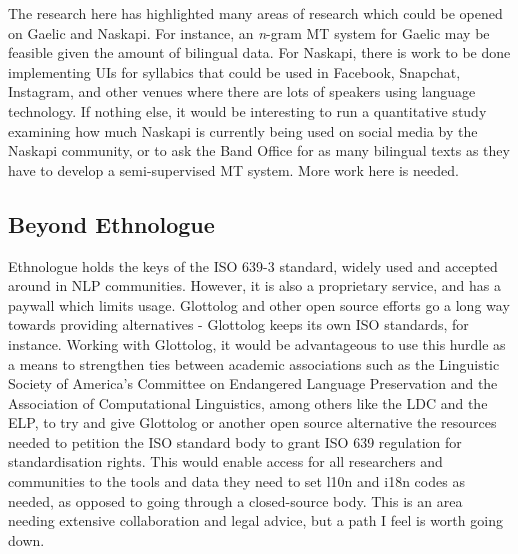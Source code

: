 The research here has highlighted many areas of research which could be opened on Gaelic and Naskapi. For instance, an \textit{n}-gram MT system for Gaelic may be feasible given the amount of bilingual data. For Naskapi, there is work to be done implementing UIs for syllabics that could be used in Facebook, Snapchat, Instagram, and other venues where there are lots of speakers using language technology. If nothing else, it would be interesting to run a quantitative study examining how much Naskapi is currently being used on social media by the Naskapi community, or to ask the Band Office for as many bilingual texts as they have to develop a semi-supervised MT system. More work here is needed.

\subsection{Beyond Ethnologue}

Ethnologue holds the keys of the ISO 639-3 standard, widely used and accepted around in NLP communities. However, it is also a proprietary service, and has a paywall which limits usage. Glottolog and other open source efforts go a long way towards providing alternatives - Glottolog keeps its own ISO standards, for instance. Working with Glottolog, it would be advantageous to use this hurdle as a means to strengthen ties between academic associations such as the Linguistic Society of America's Committee on Endangered Language Preservation and the Association of Computational Linguistics, among others like the LDC and the ELP, to try and give Glottolog or another open source alternative the resources needed to petition the ISO standard body to grant ISO 639 regulation for standardisation rights. This would enable access for all researchers and communities to the tools and data they need to set l10n and i18n codes as needed, as opposed to going through a closed-source body. This is an area needing extensive collaboration and legal advice, but a path I feel is worth going down.

%

